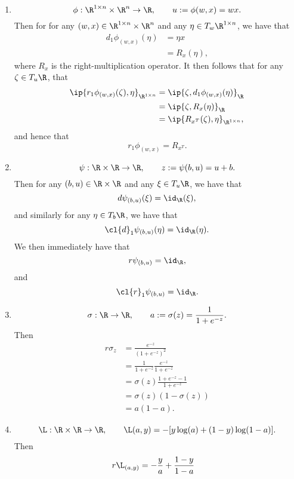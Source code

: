 \begin{enumerate}
	\item $$\phi:\R^{1\times n}\times\R^n\to\R,\qquad u:=\phi(w,x)=wx.$$
	Then for for any $(w,x)\in\R^{1\times n}\times\R^n$ and any $\eta\in T_w\R^{1\times n}$, we have that
	\begin{align*}
		d_1\phi_{(w,x)}(\eta)&=\eta x\\
		&=R_x(\eta),
	\end{align*}
	where $R_x$ is the right-multiplication operator.  It then follows that for any $\zeta\in T_u\R$, that
	\begin{align*}
		\ip{r_1\phi_{(w,x)}(\zeta),\eta}_{\R^{1\times n}}&=\ip{\zeta,d_1\phi_{(w,x)}(\eta)}_\R\\
		&=\ip{\zeta,R_x(\eta)}_\R\\
		&=\ip{R_{x^T}(\zeta),\eta}_{\R^{1\times n}},
	\end{align*}
	and hence that
	$$r_1\phi_{(w,x)}=R_{x^T}.$$
	
	\item $$\psi:\R\times\R\to\R,\qquad z:=\psi(b,u)=u+b.$$
	Then for any $(b,u)\in\R\times\R$ and any $\xi\in T_u\R$, we have that
	$$d\psi_{(b,u)}(\xi)=\id_\R(\xi),$$
	and similarly for any $\eta\in T_b\R$, we have that
	$$\cl{d}_1\psi_{(b,u)}(\eta)=\id_\R(\eta).$$
	We then immediately have that
	$$r\psi_{(b,u)}=\id_\R,$$
	and
	$$\cl{r}_1\psi_{(b,u)}=\id_\R.$$
	
	\item $$\sigma:\R\to\R,\qquad a:=\sigma(z)=\frac{1}{1+e^{-z}}.$$
	Then
	\begin{align*}
		r\sigma_z&=\frac{e^{-z}}{(1+e^{-z})^2}\\
		&=\frac{1}{1+e^{-z}}\frac{e^{-z}}{1+e^{-z}}\\
		&=\sigma(z)\frac{1+e^{-z}-1}{1+e^{-z}}\\
		&=\sigma(z)(1-\sigma(z))\\
		&=a(1-a).
	\end{align*}
	
	\item $$\L:\R\times\R\to\R,\qquad \L(a,y)=-[y\log(a)+(1-y)\log(1-a)].$$
	Then
	\begin{align*}
		r\L_{(a,y)}&=-\frac{y}{a}+\frac{1-y}{1-a}
	\end{align*}
	
\end{enumerate}

